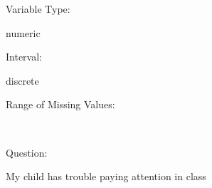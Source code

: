 \documentclass[
]{article}
\begin{document}
\begin{minipage}[t]{0.3\linewidth}

Variable Type:

\end{minipage}%
\begin{minipage}[t]{0.7\linewidth}

numeric

\end{minipage}

\begin{minipage}[t]{0.3\linewidth}

Interval:

\end{minipage}%
\begin{minipage}[t]{0.7\linewidth}

discrete

\end{minipage}

\begin{minipage}[t]{0.3\linewidth}

Range of Missing Values:

\end{minipage}%
\begin{minipage}[t]{0.7\linewidth}

~

\end{minipage}

\begin{minipage}[t]{0.3\linewidth}

Question:

\end{minipage}%
\begin{minipage}[t]{0.7\linewidth}

My child has trouble paying attention in class

\end{minipage}
\end{document}
